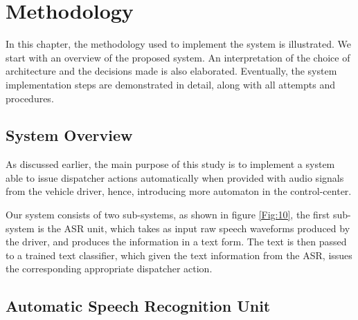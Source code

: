 \chapter{Methodology}
\label{chap:methodology}

 \hypersetup{
	colorlinks=false,
	linkcolor=black,
	filecolor=black,
	citecolor = blue,      
	urlcolor=cyan,
}

In this chapter, the methodology used to implement the system is illustrated. We start with an overview of the proposed system. An interpretation of the choice of architecture and the decisions made is also elaborated. Eventually, the system implementation steps are demonstrated in detail, along with all attempts and procedures.




\section{System Overview} 
\label{meth:s1}

As discussed earlier, the main purpose of this study is to implement a system able to issue dispatcher actions automatically when provided with audio signals from the vehicle driver, hence, introducing more automaton in the control-center. 

Our system consists of two sub-systems, as shown in figure \ref{Fig:10}, the first sub-system is the \ac{ASR} unit, which takes as input raw speech waveforms produced by the driver, and produces the information in a text form. The text is then passed to a trained text classifier, which given the text information from the \ac{ASR}, issues the corresponding appropriate dispatcher action.

\section{Automatic Speech Recognition Unit} 
\label{meth:s2}


